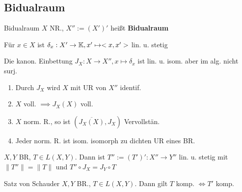 \subsection{Bidualraum}

\begin{definition}{Bidualraum}
    \(X\) NR., \(X'' := (X')'\) heißt \textbf{Bidualraum}
\end{definition}

\begin{bemerkung}
    Für \(x\in X\) ist \(\delta_x: X' \to \mathbb{K}, x'\mapsto <x,x'>\) lin. u. stetig
\end{bemerkung}

\begin{satz}
    Die kanon. Einbettung \(J_X : X\to X'', x\mapsto \delta_x\) ist lin. u.
    isom. aber im alg. nicht surj.
\end{satz}

\begin{bemerkung}
    \begin{enumerate}[label=(\roman*)]
        \item Durch \(J_X\) wird \(X\) mit UR von \(X''\) identif.
        \item \(X\) voll. \(\implies J_X(X)\) voll.
        \item \(X\) norm. R., so ist \((\overline{J_X(X)}, J_X)\) Vervollstän.
        \item Jeder norm. R. ist isom. isomorph zu dichten UR eines BR.
    \end{enumerate}
\end{bemerkung}

\begin{lemma}
    \(X,Y\) BR, \(T\in L(X,Y)\). Dann ist \(T'' := (T')':X''\to Y''\) lin. u.
    stetig mit \(\|T''\| = \|T\|\) und \(T'' \circ J_X = J_Y \circ T \)
\end{lemma}

\begin{satz}{Satz von Schauder}
    \(X,Y\) BR., \(T\in L(X,Y)\). Dann gilt
    \(T\) komp. \(\Leftrightarrow T'\) komp.
\end{satz}